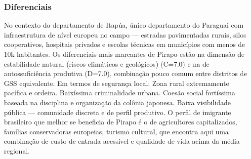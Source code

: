 \subsubsection*{Diferenciais}\label{dif-pirapo-0729}
No contexto do departamento de Itapúa, único departamento do Paraguai com infraestrutura de nível europeu no campo — estradas pavimentadas rurais, silos cooperativos, hospitais privados e escolas técnicas em municípios com menos de 10k habitantes. Os diferenciais mais marcantes de Pirapo estão na dimensão de estabilidade natural (riscos climáticos e geológicos) (C=7.0) e na de autossuficiência produtiva (D=7.0), combinação pouco comum entre distritos de GSS equivalente. Em termos de segurança local: Zona rural extremamente pacífica e ordeira. Baixíssima criminalidade urbana. Coesão social fortíssima baseada na disciplina e organização da colônia japonesa. Baixa visibilidade pública — comunidade discreta e de perfil produtivo. O perfil de imigrante brasileiro que melhor se beneficia de Pirapo é o de agricultores capitalizados, famílias conservadoras europeias, turismo cultural, que encontra aqui uma combinação de custo de entrada acessível e qualidade de vida acima da média regional.
